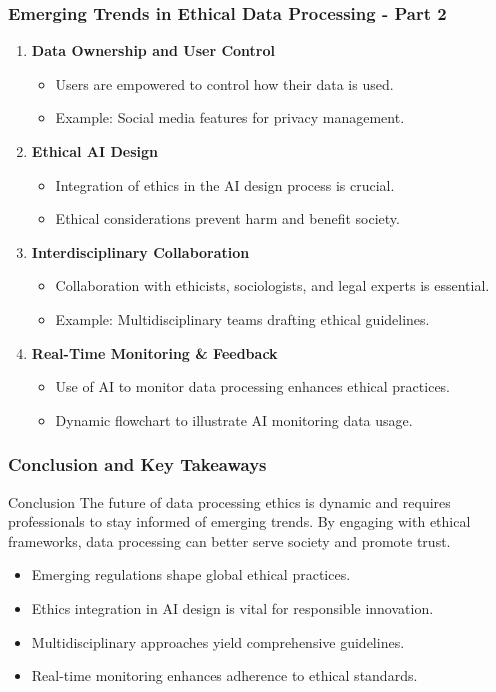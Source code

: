 \documentclass[aspectratio=169]{beamer}
\begin{document}
\begin{frame}[fragile]
  \frametitle{Emerging Trends in Ethical Data Processing - Part 2}
  \begin{enumerate}[resume]
    \item \textbf{Data Ownership and User Control}
      \begin{itemize}
        \item Users are empowered to control how their data is used.
        \item Example: Social media features for privacy management.
      \end{itemize}

    \item \textbf{Ethical AI Design}
      \begin{itemize}
        \item Integration of ethics in the AI design process is crucial.
        \item Ethical considerations prevent harm and benefit society.
      \end{itemize}

    \item \textbf{Interdisciplinary Collaboration}
      \begin{itemize}
        \item Collaboration with ethicists, sociologists, and legal experts is essential.
        \item Example: Multidisciplinary teams drafting ethical guidelines.
      \end{itemize}

    \item \textbf{Real-Time Monitoring \& Feedback}
      \begin{itemize}
        \item Use of AI to monitor data processing enhances ethical practices.
        \item Dynamic flowchart to illustrate AI monitoring data usage.
      \end{itemize}
  \end{enumerate}
\end{frame}

\begin{frame}[fragile]
  \frametitle{Conclusion and Key Takeaways}
  \begin{block}{Conclusion}
    The future of data processing ethics is dynamic and requires professionals to stay informed of emerging trends. 
    By engaging with ethical frameworks, data processing can better serve society and promote trust.
  \end{block}
  
  \begin{itemize}
    \item Emerging regulations shape global ethical practices.
    \item Ethics integration in AI design is vital for responsible innovation.
    \item Multidisciplinary approaches yield comprehensive guidelines.
    \item Real-time monitoring enhances adherence to ethical standards.
  \end{itemize}
\end{frame}
\end{document}
